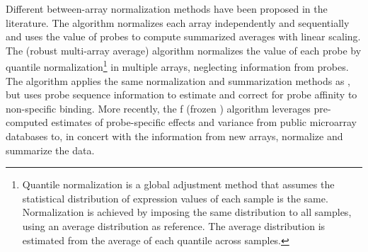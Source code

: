 Different between-array normalization methods have been proposed in the
literature.  The  algorithm\cite{hubbell_robust_2002} normalizes
each array independently and sequentially and uses the value of 
probes to compute summarized averages with linear scaling.  The 
(robust multi-array average) algorithm\cite{irizarry_exploration_2003}
normalizes the value of each probe by quantile normalization\footnote{Quantile
  normalization is a global adjustment method that assumes the statistical
  distribution of expression values of each sample is the same.  Normalization
  is achieved by imposing the same distribution to all samples, using an average
  distribution as reference.  The average distribution is estimated from the
  average of each quantile across samples.} in multiple arrays, neglecting
information from  probes.  The 
algorithm\cite{wu_model-based_2004} applies the same normalization and
summarization methods as , but uses probe sequence information to
estimate and correct for probe affinity to non-specific binding.  More recently,
the f (frozen ) algorithm\cite{mccall_frozen_2010}
leverages pre-computed estimates of probe-specific effects and variance from
public microarray databases to, in concert with the information from new arrays,
normalize and summarize the data.



